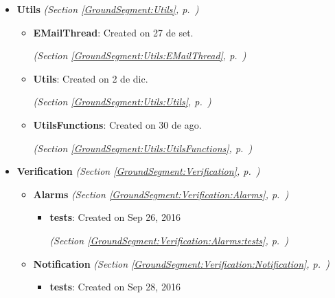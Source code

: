 \begin{itemize}
\setlength{\parskip}{0ex}
\item \textbf{Utils}
  \textit{(Section \ref{GroundSegment:Utils}, p.~\pageref{GroundSegment:Utils})}

  \begin{itemize}
\setlength{\parskip}{0ex}
    \item \textbf{EMailThread}: Created on 27 de set.



  \textit{(Section \ref{GroundSegment:Utils:EMailThread}, p.~\pageref{GroundSegment:Utils:EMailThread})}

    \item \textbf{Utils}: Created on 2 de dic.



  \textit{(Section \ref{GroundSegment:Utils:Utils}, p.~\pageref{GroundSegment:Utils:Utils})}

    \item \textbf{UtilsFunctions}: Created on 30 de ago.



  \textit{(Section \ref{GroundSegment:Utils:UtilsFunctions}, p.~\pageref{GroundSegment:Utils:UtilsFunctions})}

  \end{itemize}
\item \textbf{Verification}
  \textit{(Section \ref{GroundSegment:Verification}, p.~\pageref{GroundSegment:Verification})}

  \begin{itemize}
\setlength{\parskip}{0ex}
    \item \textbf{Alarms}
  \textit{(Section \ref{GroundSegment:Verification:Alarms}, p.~\pageref{GroundSegment:Verification:Alarms})}

      \begin{itemize}
    \setlength{\parskip}{0ex}
        \item \textbf{tests}: Created on Sep 26, 2016



  \textit{(Section \ref{GroundSegment:Verification:Alarms:tests}, p.~\pageref{GroundSegment:Verification:Alarms:tests})}

      \end{itemize}
    \item \textbf{Notification}
  \textit{(Section \ref{GroundSegment:Verification:Notification}, p.~\pageref{GroundSegment:Verification:Notification})}

      \begin{itemize}
    \setlength{\parskip}{0ex}
        \item \textbf{tests}: Created on Sep 28, 2016




\end{itemize}
\end{itemize}
\end{itemize}
